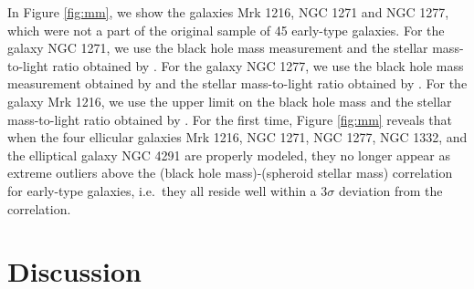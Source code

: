 \documentclass[useAMS,usenatbib,article]{mn2e}
\begin{document}
In Figure \ref{fig:mm}, we show the galaxies Mrk 1216, NGC 1271 and NGC 1277, 
which were not a part of the original sample of 45 early-type galaxies.
For the galaxy NGC 1271, we use the black hole mass measurement 
and the stellar mass-to-light ratio obtained by \cite{walsh2015}. 
For the galaxy NGC 1277, we use the black hole mass measurement obtained by \cite{vandenbosch2012} 
and the stellar mass-to-light ratio obtained by \cite{martinnavarro2015}. 
For the galaxy Mrk 1216, we use the upper limit on the black hole mass 
and the stellar mass-to-light ratio obtained by \cite{yildirim2015}. 
For the first time, Figure \ref{fig:mm} reveals that when the four ellicular galaxies Mrk 1216, NGC 1271, NGC 1277, NGC 1332, 
and the elliptical galaxy NGC 4291 are properly modeled, 
they no longer appear as extreme outliers above the (black hole mass)-(spheroid stellar mass) correlation for early-type galaxies, 
i.e.~they all reside well within a $3\sigma$ deviation from the correlation.


\section{Discussion}
\label{sec:disc}
\end{document}
